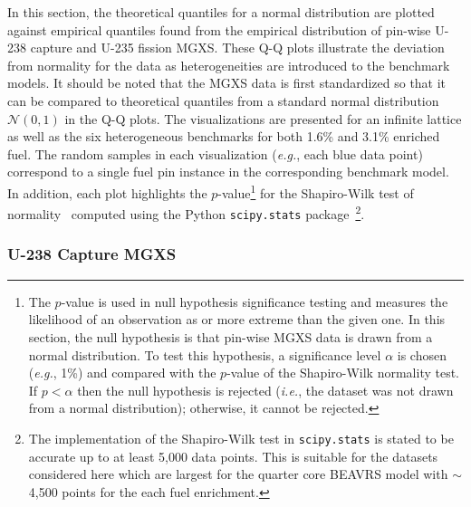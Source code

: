 In this section, the theoretical quantiles for a normal distribution are plotted against empirical quantiles found from the empirical distribution of pin-wise U-238 capture and U-235 fission \ac{MGXS}. These \ac{Q-Q} plots illustrate the deviation from normality for the data as heterogeneities are introduced to the benchmark models. It should be noted that the \ac{MGXS} data is first standardized so that it can be compared to theoretical quantiles from a standard normal distribution $\mathcal{N}(0,1)$ in the \ac{Q-Q} plots. The visualizations are presented for an infinite lattice as well as the six heterogeneous benchmarks for both 1.6\% and 3.1\% enriched fuel. The random samples in each visualization (\textit{e.g.}, each blue data point) correspond to a single fuel pin instance in the corresponding benchmark model. In addition, each plot highlights the $p$-value\footnote{The $p$-value is used in null hypothesis significance testing and measures the likelihood of an observation as or more extreme than the given one. In this section, the null hypothesis is that pin-wise \ac{MGXS} data is drawn from a normal distribution. To test this hypothesis, a significance level $\alpha$ is chosen (\textit{e.g.}, 1\%) and compared with the $p$-value of the Shapiro-Wilk normality test. If $p < \alpha$ then the null hypothesis is rejected (\textit{i.e.}, the dataset was not drawn from a normal distribution); otherwise, it cannot be rejected.} for the Shapiro-Wilk test of normality~\cite{shapiro1965analysis} computed using the Python \texttt{scipy.stats} package~\cite{jones2011scipy}\footnote{The implementation of the Shapiro-Wilk test in \texttt{scipy.stats} is stated to be accurate up to at least 5,000 data points. This is suitable for the datasets considered here which are largest for the quarter core \ac{BEAVRS} model with $\sim$4,500 points for the each fuel enrichment.}.

\subsubsection{U-238 Capture MGXS}
\label{subsubsec:chap9-qq-plots-capt}

